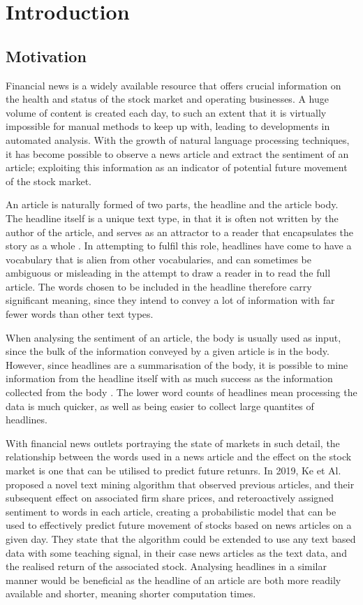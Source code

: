 
\chapter{Introduction}
\label{chap:context}
\section{Motivation}
\label{sec:motivation}
Financial news is a widely available resource that offers crucial information on the health and status of the stock market and operating businesses. A huge volume of content is created each day, to such an extent that it is virtually impossible for manual methods to keep up with, leading to developments in automated analysis. With the growth of natural language processing techniques, it has become possible to observe a news article and extract the sentiment of an article; exploiting this information as an indicator of potential future movement of the stock market.

An article is naturally formed of two parts, the headline and the article body. The headline itself is a unique text type, in that it is often not written by the author of the article, and serves as an attractor to a reader that encapsulates the story as a whole \cite{language-newspapers}. In attempting to fulfil this role, headlines have come to have a vocabulary that is alien from other vocabularies, and can sometimes be ambiguous or misleading in the attempt to draw a reader in to read the full article. The words chosen to be included in the headline therefore carry significant meaning, since they intend to convey a lot of information with far fewer words than other text types.

When analysing the sentiment of an article, the body is usually used as input, since the bulk of the information conveyed by a given article is in the body. However, since headlines are a summarisation of the body, it is possible to mine information from the headline itself with as much success as the information collected from the body \cite{headline-sentiment}. The lower word counts of headlines mean processing the data is much quicker, as well as being easier to collect large quantites of headlines.

With financial news outlets portraying the state of markets in such detail, the relationship between the words used in a news article and the effect on the stock market is one that can be utilised to predict future retunrs. In 2019, Ke et Al. \cite{sestm} proposed a novel text mining algorithm that observed previous articles, and their subsequent effect on associated firm share prices, and reteroactively assigned sentiment to words in each article, creating a probabilistic model that can be used to effectively predict future movement of stocks based on news articles on a given day. They state that the algorithm could be extended to use any text based data with some teaching signal, in their case news articles as the text data, and the realised return of the associated stock. Analysing headlines in a similar manner would be beneficial as the headline of an article are both more readily available and shorter, meaning shorter computation times.

